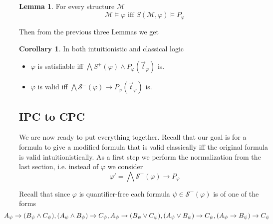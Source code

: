 \documentclass[a4paper,12pt]{report}
\theoremstyle{definition}
\theoremstyle{definition}
\newtheorem{corollary}[theorem]{Corollary}
\theoremstyle{definition}
\newtheorem{lemma}[theorem]{Lemma}
\theoremstyle{definition}
\theoremstyle{definition}
\theoremstyle{definition}
\theoremstyle{definition}
\begin{document}
	\begin{lemma}
		For every structure $\mathcal M$
		$$\mathcal M\models \varphi\text{ iff }S(\mathcal M, \varphi)\models P_\varphi$$
	\end{lemma}

	Then from the previous three Lemmas we get
	
	\begin{corollary}\label{equivalid}
		In both intuitionistic and classical logic
		\begin{itemize}
			\item $\varphi$ is satisfiable iff $\mathcal \bigwedge S^+(\varphi)\wedge P_\varphi(\vec t_\varphi)$ is. 
			\item $\varphi$ is valid iff $\bigwedge\mathcal S^-(\varphi)\to P_\varphi(\vec t_\varphi)$ is.
		\end{itemize}
	\end{corollary}
	
	\subsection{IPC to CPC}

	We are now ready to put everything together. Recall that our goal is for a formula to give a modified formula that is valid classically iff the original formula is valid intuitionistically. As a first step we perform the normalization from the last section, i.e. instead of $\varphi$ we consider $$\varphi' = \bigwedge \mathcal S^-(\varphi)\to P_\varphi$$
	
	Recall that since $\varphi$ is quantifier-free each formula $\psi\in\mathcal S^-(\varphi)$ is of one of the forms
	$$\hspace{-0.8cm}A_\psi\to (B_\psi\wedge C_\psi), (A_\psi\wedge B_\psi)\to C_\psi, A_\psi\to (B_\psi\vee C_\psi), (A_\psi\vee B_\psi)\to C_\psi, (A_\psi\to B_\psi)\to C_\psi$$
	
\end{document}
